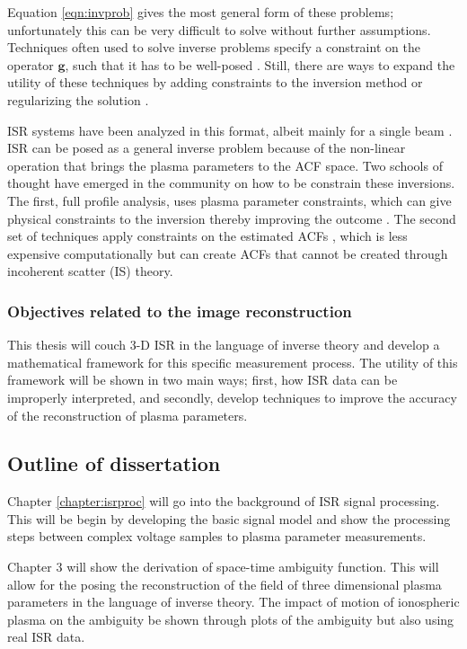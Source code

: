 Equation \ref{eqn:invprob} gives the most general form of these problems; unfortunately this can be very difficult to solve without further assumptions. Techniques often used to solve inverse problems specify a constraint on the operator $\mathbf{g}$, such that it has to be well-posed \cite{0266-5611-4-4-010}. Still, there are ways to expand the utility of these techniques by adding constraints to the inversion method or regularizing the solution \cite{Vogel:2002:CMI:581830,Karl:2005jy}.

ISR systems have been analyzed in this format, albeit mainly for a single beam \cite{Vierinen:2012ve}. ISR can be posed as a general inverse problem because of the non-linear operation that brings the plasma parameters to the ACF space. Two schools of thought have emerged in the community on how to be constrain these inversions. The first, full profile analysis, uses plasma parameter constraints, which can give physical constraints to the inversion thereby improving the outcome \cite{hysell2008,RDS:RDS3308}. The second set of techniques apply constraints on the estimated ACFs \cite{Virtanen:20082vx,nikoukar2008}, which is less expensive computationally but can create ACFs that cannot be created through incoherent scatter (IS) theory.

\subsubsection{Objectives related to the image reconstruction}
This thesis will couch 3-D ISR in the language of inverse theory and develop a mathematical framework for this specific measurement process. The utility of this framework will be shown in two main ways; first, how ISR data can be improperly interpreted, and secondly, develop techniques to improve the accuracy of the reconstruction of plasma parameters.

\subsection{Outline of dissertation}

Chapter \ref{chapter:isrproc} will go into the background of ISR signal processing. This will be begin by developing the basic signal model and show the processing steps between complex voltage samples to plasma parameter measurements.

Chapter 3 will show the derivation of space-time ambiguity function. This will allow for the posing the reconstruction of the field of three dimensional plasma parameters in the language of inverse theory. The impact of motion of ionospheric plasma on the ambiguity be shown through plots of the ambiguity but also using real ISR data.  

